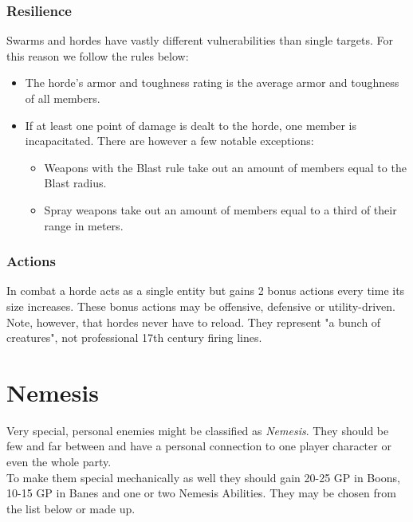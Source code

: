 \documentclass[12pt,a4paper,openany]{book}
\begin{document}
	\subsection*{Resilience}
	Swarms and hordes have vastly different vulnerabilities than single targets. For this reason we follow the rules below:
	\begin{itemize}
		\setlength\itemsep{-8mm} \vspace{-8mm}
		\item The horde's armor and toughness rating is the average armor and toughness of all members.
		\item If at least one point of damage is dealt to the horde, one member is incapacitated. There are however a few notable exceptions:
			\begin{itemize}
				\setlength\itemsep{-8mm} \vspace{-8mm}
				\item Weapons with the Blast rule take out an amount of members equal to the Blast radius.
				\item Spray weapons take out an amount of members equal to a third of their range in meters.
			\end{itemize}
	\end{itemize}
	
	\subsection*{Actions}
	In combat a horde acts as a single entity but gains 2 bonus actions every time its size increases. These bonus actions may be offensive, defensive or utility-driven. \\
	Note, however, that hordes never have to reload. They represent "a bunch of creatures", not professional 17th century firing lines.


	\chapter{Nemesis}
	Very special, personal enemies might be classified as \emph{Nemesis}. They should be few and far between and have a personal connection to one player character or even the whole party.\\
	To make them special mechanically as well they should gain 20-25 GP in Boons, 10-15 GP in Banes and one or two Nemesis Abilities. They may be chosen from the list below or made up.
\end{document}
